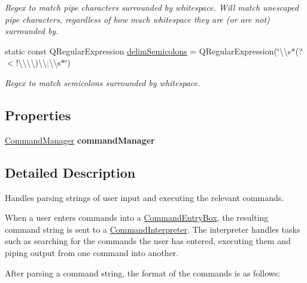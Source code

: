 \begin{DoxyCompactItemize}
\begin{DoxyCompactList}\small\item\em Regex to match pipe characters surrounded by whitespace. Will match unescaped pipe characters, regardless of how much whitespace they are (or are not) surrounded by.\par
 {\bfseries  }\end{DoxyCompactList}\item 
static const Q\-Regular\-Expression \hyperlink{class_command_interpreter_abb5a98083df85f3bb4f3680c5d7a26a9}{delim\-Semicolons} = Q\-Regular\-Expression(\char`\"{}\textbackslash{}\textbackslash{}s$\ast$(?$<$!\textbackslash{}\textbackslash{}\textbackslash{}\textbackslash{})\textbackslash{}\textbackslash{};\textbackslash{}\textbackslash{}s$\ast$\char`\"{})
\begin{DoxyCompactList}\small\item\em Regex to match semicolons surrounded by whitespace.\par
 {\bfseries  }\end{DoxyCompactList}\end{DoxyCompactItemize}
\subsection*{Properties}
\begin{DoxyCompactItemize}
\item 
\hypertarget{class_command_interpreter_a55b2fdaa6980155bf4576fb2436de99a}{\hyperlink{class_command_manager}{Command\-Manager} {\bfseries command\-Manager}}\label{class_command_interpreter_a55b2fdaa6980155bf4576fb2436de99a}

\end{DoxyCompactItemize}


\subsection{Detailed Description}
Handles parsing strings of user input and executing the relevant commands. 

When a user enters commands into a \hyperlink{class_command_entry_box}{Command\-Entry\-Box}, the resulting command string is sent to a \hyperlink{class_command_interpreter}{Command\-Interpreter}. The interpreter handles tasks such as searching for the commands the user has entered, executing them and piping output from one command into another.

After parsing a command string, the format of the commands is as follows\-:


